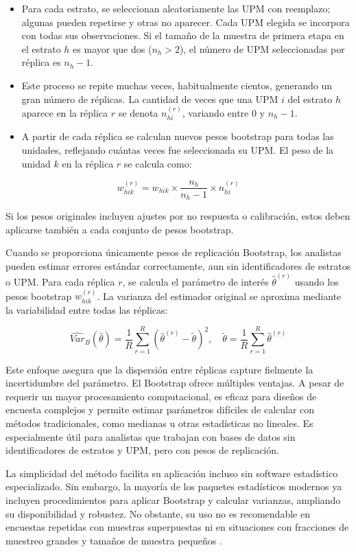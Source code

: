 \documentclass[
  spanish,
  12pt,
]{book}
\providecommand{\tightlist}{%
  \setlength{\itemsep}{0pt}\setlength{\parskip}{0pt}}
\begin{document}
\begin{itemize}
\tightlist
\item
  Para cada estrato, se seleccionan aleatoriamente las UPM con reemplazo; algunas pueden repetirse y otras no aparecer. Cada UPM elegida se incorpora con todas sus observaciones. Si el tamaño de la muestra de primera etapa en el estrato \(h\) es mayor que dos (\(n_h > 2\)), el número de UPM seleccionadas por réplica es \(n_h - 1\).
\item
  Este proceso se repite muchas veces, habitualmente cientos, generando un gran número de réplicas. La cantidad de veces que una UPM \(i\) del estrato \(h\) aparece en la réplica \(r\) se denota \(n_{hi}^{(r)}\), variando entre 0 y \(n_h - 1\).
\item
  A partir de cada réplica se calculan nuevos pesos bootstrap para todas las unidades, reflejando cuántas veces fue seleccionada su UPM. El peso de la unidad \(k\) en la réplica \(r\) se calcula como:
\end{itemize}

\[
w_{hik}^{(r)} = w_{hik} \times \frac{n_h}{n_h - 1} \times n_{hi}^{(r)}
\]

Si los pesos originales incluyen ajustes por no respuesta o calibración, estos deben aplicarse también a cada conjunto de pesos bootstrap.

Cuando se proporciona únicamente pesos de replicación Bootstrap, los analistas pueden estimar errores estándar correctamente, aun sin identificadores de estratos o UPM. Para cada réplica \(r\), se calcula el parámetro de interés \(\hat{\theta}^{(r)}\) usando los pesos bootstrap \(w_{hik}^{(r)}\). La varianza del estimador original se aproxima mediante la variabilidad entre todas las réplicas:

\[
\widehat{Var}_B(\hat{\theta}) = \frac{1}{R} \sum_{r=1}^{R} \left(\hat{\theta}^{(r)} - \tilde{\theta}\right)^2, \quad
\tilde{\theta} = \frac{1}{R} \sum_{r=1}^{R} \hat{\theta}^{(r)}
\]

Este enfoque asegura que la dispersión entre réplicas capture fielmente la incertidumbre del parámetro. El Bootstrap ofrece múltiples ventajas. A pesar de requerir un mayor procesamiento computacional, es eficaz para diseños de encuesta complejos y permite estimar parámetros difíciles de calcular con métodos tradicionales, como medianas u otras estadísticas no lineales. Es especialmente útil para analistas que trabajan con bases de datos sin identificadores de estratos y UPM, pero con pesos de replicación.

La simplicidad del método facilita su aplicación incluso sin software estadístico especializado. Sin embargo, la mayoría de los paquetes estadísticos modernos ya incluyen procedimientos para aplicar Bootstrap y calcular varianzas, ampliando su disponibilidad y robustez. No obstante, su uso no es recomendable en encuestas repetidas con muestras superpuestas ni en situaciones con fracciones de muestreo grandes y tamaños de muestra pequeños \citep{bruch2011variance}.
\end{document}
